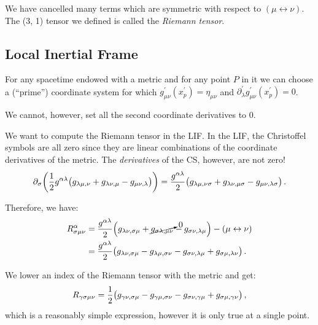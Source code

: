 \documentclass[main.tex]{subfiles}
\begin{document}
We have cancelled many terms which are symmetric with respect to \((\mu \leftrightarrow \nu )\).
The (3, 1) tensor we defined is called the \emph{Riemann tensor}.

\subsection{Local Inertial Frame}

\begin{claim}
    For any spacetime endowed with a metric and for any point \(P\) in it we can choose a (``prime'') coordinate system for which \(g^{\prime }_{\mu \nu } (x^{\prime }_{p}) = \eta_{\mu \nu }\) and \(\partial_{\lambda }^{\prime } g^{\prime }_{\mu \nu }(x^{\prime }_{p}) = 0\). 

    We cannot, however, set all the second coordinate derivatives to 0.
\end{claim}

We want to compute the Riemann tensor in the LIF. In the LIF, the Christoffel symbols are all zero since they are linear combinations of the coordinate derivatives of the metric. The \emph{derivatives} of the CS, however, are not zero!  
%
\begin{equation}
    \partial_\sigma\qty(\frac{1}{2} g^{\alpha \lambda } \qty(g_{\lambda \mu , \nu }+ g_{\lambda \nu , \mu } - g_{\mu \nu , \lambda })) = 
    \frac{g^{\alpha \lambda }}{2} \qty(g_{\lambda \mu , \nu \sigma } + g_{\lambda \nu , \mu \sigma } - g_{\mu \nu, \lambda \sigma })
\,.
\end{equation}
%

Therefore, we have: 
%
\begin{subequations}
\begin{align}
  R^{\alpha }_{\sigma \mu \nu } &= \frac{g^{\alpha \lambda }}{2} \qty(
      g_{\lambda \nu , \sigma \mu } 
      + \cancelto{0}{g_{\sigma \lambda , \mu \nu }} 
      - g_{\sigma \nu, \lambda \mu }
  ) - (\mu \leftrightarrow \nu)  \\
  &= \frac{g^{\alpha \lambda }}{2} \qty(
    g_{\lambda \nu , \sigma \mu } 
    -g_{\lambda \mu , \sigma \nu } 
    - g_{\sigma \nu, \lambda \mu }
    + g_{\sigma \mu, \lambda \nu }
)
\,.
\end{align}
\end{subequations}
%

We lower an index of the Riemann tensor with the metric and get: 
%
\begin{equation}
  R_{\gamma \sigma \mu \nu } = \frac{1}{2} \qty(
    g_{\gamma \nu , \sigma \mu } 
    -g_{\gamma \mu , \sigma \nu } 
    - g_{\sigma \nu, \gamma \mu }
    + g_{\sigma \mu, \gamma \nu }
  )
\,,
\end{equation}
%
which is a reasonably simple expression, however it is only true at a single point.
\end{document}
